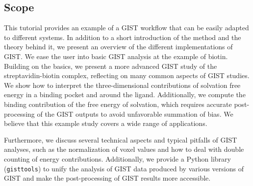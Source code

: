 \documentclass[9pt,tutorial]{livecoms}
\newcommand{\software}{\texttt}
\begin{document}
%
%
%

\subsection{Scope}

This tutorial provides an example of a GIST workflow that can be easily adapted to different systems. 
In addition to a short introduction of the method and the theory behind it, we present an overview of the different implementations of GIST.
We ease the user into basic GIST analysis at the example of biotin.
Building on the basics, we present a more advanced GIST study of the streptavidin-biotin complex, reflecting on many common aspects of GIST studies.
We show how to interpret the three-dimensional contributions of solvation free energy in a binding pocket and around the ligand.
Additionally, we compute the binding contribution of the free energy of solvation, which requires accurate post-processing of the GIST outputs to avoid unfavorable summation of bias.
We believe that this example study covers a wide range of applications.

Furthermore, we discuss several technical aspects and typical pitfalls of GIST analyses, such as the normalization of voxel values and how to deal with double counting of energy contributions. 
Additionally, we provide a Python library (\software{gisttools}) to unify the analysis of GIST data produced by various versions of GIST and make the post-processing of GIST results more accessible.
\end{document}
